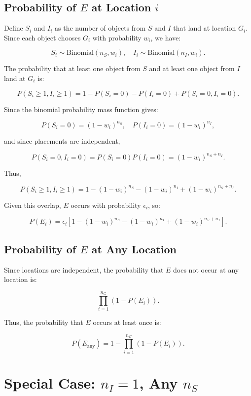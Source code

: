 \documentclass[11pt]{article}
\begin{document}
\subsection{Probability of \( E \) at Location \( i \)}

Define \( S_i \) and \( I_i \) as the number of objects from \( S \) and \( I \) that land at location \( G_i \). Since each object chooses \( G_i \) with probability \( w_i \), we have:

\[
S_i \sim \text{Binomial}(n_S, w_i), \quad I_i \sim \text{Binomial}(n_I, w_i).
\]

The probability that at least one object from \( S \) and at least one object from \( I \) land at \( G_i \) is:

\[
P(S_i \geq 1, I_i \geq 1) = 1 - P(S_i = 0) - P(I_i = 0) + P(S_i = 0, I_i = 0).
\]

Since the binomial probability mass function gives:

\[
P(S_i = 0) = (1 - w_i)^{n_S}, \quad P(I_i = 0) = (1 - w_i)^{n_I},
\]

and since placements are independent,

\[
P(S_i = 0, I_i = 0) = P(S_i = 0) P(I_i = 0) = (1 - w_i)^{n_S + n_I}.
\]

Thus,

\[
P(S_i \geq 1, I_i \geq 1) = 1 - (1 - w_i)^{n_S} - (1 - w_i)^{n_I} + (1 - w_i)^{n_S + n_I}.
\]

Given this overlap, \( E \) occurs with probability \( \epsilon_i \), so:

\[
P(E_i) = \epsilon_i \left[ 1 - (1 - w_i)^{n_S} - (1 - w_i)^{n_I} + (1 - w_i)^{n_S + n_I} \right].
\]

\subsection{Probability of \( E \) at Any Location}

Since locations are independent, the probability that \( E \) does not occur at any location is:

\[
\prod_{i=1}^{n_G} \left( 1 - P(E_i) \right).
\]

Thus, the probability that \( E \) occurs at least once is:

\[
P(E_{\text{any}}) = 1 - \prod_{i=1}^{n_G} \left( 1 - P(E_i) \right).
\]

\section{Special Case: \( n_I = 1 \), Any \( n_S \)}
\end{document}
